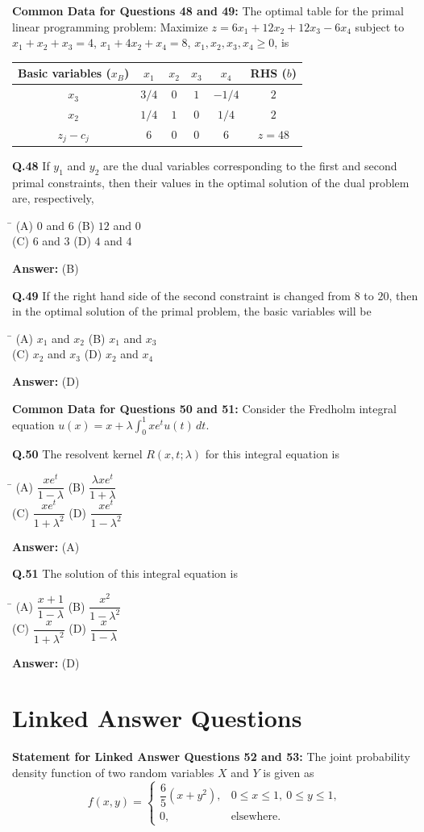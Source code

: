 \documentclass[11pt,a4paper]{article}
\newcommand{\optsfourA}[4]{%
  \begin{tabbing}
    \hspace{0.48\linewidth}\=\kill
    (A) #1 \> (B) #2 \\[2pt]
    (C) #3 \> (D) #4
  \end{tabbing}%
}
\newcommand{\ans}[1]{\textbf{Answer:} #1\par\medskip}
\begin{document}
\textbf{Common Data for Questions 48 and 49:}
The optimal table for the primal linear programming problem: Maximize $z = 6x_1 + 12x_2 + 12x_3 - 6x_4$ subject to $x_1 + x_2 + x_3 = 4$, $x_1 + 4x_2 + x_4 = 8$, $x_1, x_2, x_3, x_4 \ge 0$, is
\begin{center}
\begin{tabular}{cccccc}
  \toprule
  Basic variables ($x_B$) & $x_1$ & $x_2$ & $x_3$ & $x_4$ & RHS ($b$) \\
  \midrule
  $x_3$ & $3/4$ & $0$ & $1$ & $-1/4$ & $2$ \\
  $x_2$ & $1/4$ & $1$ & $0$ & $1/4$ & $2$ \\
  \midrule
  $z_j - c_j$ & $6$ & $0$ & $0$ & $6$ & $z = 48$ \\
  \bottomrule
\end{tabular}
\end{center}

\textbf{Q.48} If $y_1$ and $y_2$ are the dual variables corresponding to the first and second primal constraints, then their values in the optimal solution of the dual problem are, respectively,
\optsfourA{$0$ and $6$}{$12$ and $0$}{$6$ and $3$}{$4$ and $4$}
\ans{(B)}

\textbf{Q.49} If the right hand side of the second constraint is changed from $8$ to $20$, then in the optimal solution of the primal problem, the basic variables will be
\optsfourA{$x_1$ and $x_2$}{$x_1$ and $x_3$}{$x_2$ and $x_3$}{$x_2$ and $x_4$}
\ans{(D)}

\medskip
\textbf{Common Data for Questions 50 and 51:}
Consider the Fredholm integral equation $u(x) = x + \lambda \displaystyle\int_0^1 x e^t u(t)\,dt$.

\textbf{Q.50} The resolvent kernel $R(x, t; \lambda)$ for this integral equation is
\optsfourA{$\dfrac{x e^t}{1 - \lambda}$}{$\dfrac{\lambda x e^t}{1 + \lambda}$}{$\dfrac{x e^t}{1 + \lambda^2}$}{$\dfrac{x e^t}{1 - \lambda^2}$}
\ans{(A)}

\textbf{Q.51} The solution of this integral equation is
\optsfourA{$\dfrac{x + 1}{1 - \lambda}$}{$\dfrac{x^2}{1 - \lambda^2}$}{$\dfrac{x}{1 + \lambda^2}$}{$\dfrac{x}{1 - \lambda}$}
\ans{(D)}

\section*{Linked Answer Questions}

\textbf{Statement for Linked Answer Questions 52 and 53:}
The joint probability density function of two random variables $X$ and $Y$ is given as
\[
  f(x, y) = \begin{cases} \dfrac{6}{5}(x + y^2), & 0 \le x \le 1,\ 0 \le y \le 1, \\ 0, & \text{elsewhere.} \end{cases}
\]
\end{document}
